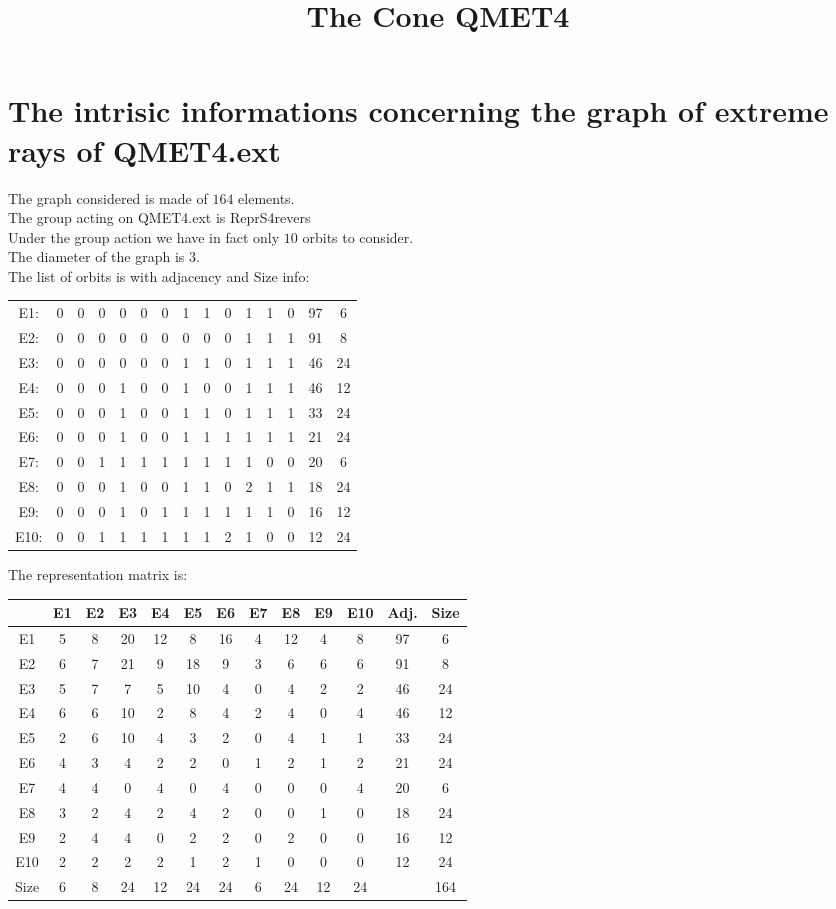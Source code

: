 \documentclass[12pt]{article}
\title{The Cone QMET4}
\begin{document}
\maketitle
\section{The intrisic informations concerning the graph of extreme rays of QMET4.ext}
The graph considered is made of $164$ elements.\\
The group acting on QMET4.ext is ReprS4revers\\
Under the group action we have in fact only $10$ orbits to consider.\\
The diameter of the graph is $3$.\\
The list of orbits is with adjacency and Size info:
\begin{center}
\scriptsize
\begin{tabular}{ccccccccccccc|c|c}
E1:&0&0&0&0&0&0&1&1&0&1&1&0&97&6\\
E2:&0&0&0&0&0&0&0&0&0&1&1&1&91&8\\
E3:&0&0&0&0&0&0&1&1&0&1&1&1&46&24\\
E4:&0&0&0&1&0&0&1&0&0&1&1&1&46&12\\
E5:&0&0&0&1&0&0&1&1&0&1&1&1&33&24\\
E6:&0&0&0&1&0&0&1&1&1&1&1&1&21&24\\
E7:&0&0&1&1&1&1&1&1&1&1&0&0&20&6\\
E8:&0&0&0&1&0&0&1&1&0&2&1&1&18&24\\
E9:&0&0&0&1&0&1&1&1&1&1&1&0&16&12\\
E10:&0&0&1&1&1&1&1&1&2&1&0&0&12&24\\
\end{tabular}
\end{center}
The representation matrix is:
\begin{center}
\scriptsize
\begin{tabular}{|c|cccccccccc|c|c|}
\hline
&E1&E2&E3&E4&E5&E6&E7&E8&E9&E10&Adj.&Size\\
\hline
E1& 5& 8& 20& 12& 8& 16& 4& 12& 4& 8&97&6\\
E2& 6& 7& 21& 9& 18& 9& 3& 6& 6& 6&91&8\\
E3& 5& 7& 7& 5& 10& 4& 0& 4& 2& 2&46&24\\
E4& 6& 6& 10& 2& 8& 4& 2& 4& 0& 4&46&12\\
E5& 2& 6& 10& 4& 3& 2& 0& 4& 1& 1&33&24\\
E6& 4& 3& 4& 2& 2& 0& 1& 2& 1& 2&21&24\\
E7& 4& 4& 0& 4& 0& 4& 0& 0& 0& 4&20&6\\
E8& 3& 2& 4& 2& 4& 2& 0& 0& 1& 0&18&24\\
E9& 2& 4& 4& 0& 2& 2& 0& 2& 0& 0&16&12\\
E10& 2& 2& 2& 2& 1& 2& 1& 0& 0& 0&12&24\\
\hline
Size&6&8&24&12&24&24&6&24&12&24&&164\\
\hline
\end{tabular}
\end{center}
\end{document}
